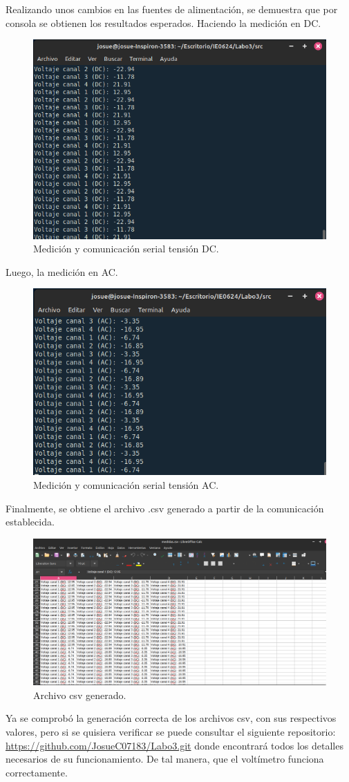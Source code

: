 Realizando unos cambios en las fuentes de alimentación, se demuestra que por consola se obtienen los resultados esperados. Haciendo la medición en DC.
\begin{figure}[H]
    \centering
    \includegraphics[width=.8\linewidth]{Imagenes/13.png}
    \caption{Medición y comunicación serial tensión DC.}
    \label{fig_13}
\end{figure}
Luego, la medición en AC.
\begin{figure}[H]
    \centering
    \includegraphics[width=.8\linewidth]{Imagenes/14.png}
    \caption{Medición y comunicación serial tensión AC.}
    \label{fig_14}
\end{figure}
Finalmente, se obtiene el archivo .csv generado a partir de la comunicación establecida.
\begin{figure}[H]
    \centering
    \includegraphics[width=.8\linewidth]{Imagenes/15.png}
    \caption{Archivo csv generado.}
    \label{fig_15}
\end{figure}

Ya se comprobó la generación correcta de los archivos csv, con sus respectivos valores, pero si se quisiera verificar se puede consultar el siguiente repositorio: \url{https://github.com/JosueC07183/Labo3.git} donde encontrará todos los detalles necesarios de su funcionamiento. De tal manera, que el voltímetro funciona correctamente.
\newpage